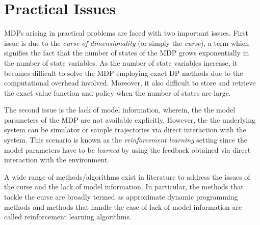 \section{Practical Issues}
MDPs arising in practical problems are faced with two important issues. First issue is due to the \emph{curse-of-dimensionality} (or simply the \emph{curse}), a term which signifies the fact that the number of states of the MDP grows exponentially in the number of state variables. As the number of state variables increase, it becomes difficult to solve the MDP employing exact DP methods due to the computational overhead involved. Moreover, it also difficult to store and retrieve the exact value function and policy when the number of states are large.\par
The second issue is the lack of model information, wherein, the the model parameters of the MDP are not available explicitly. However, the the underlying system can be simulator or sample trajectories via direct interaction with the system. This scenario is known as the \emph{reinforcement learning} setting since the model parameters have to be \emph{learned} by using the feedback obtained via direct interaction with the environment.\par
A wide range of methods/algorithms exist in literature to address the issues of the curse and the lack of model information. In particular, the methods that tackle the curse are broadly termed as  approximate dynamic programming  methods and methods that handle the case of lack of model information are called reinforcement learning algorithms. 
